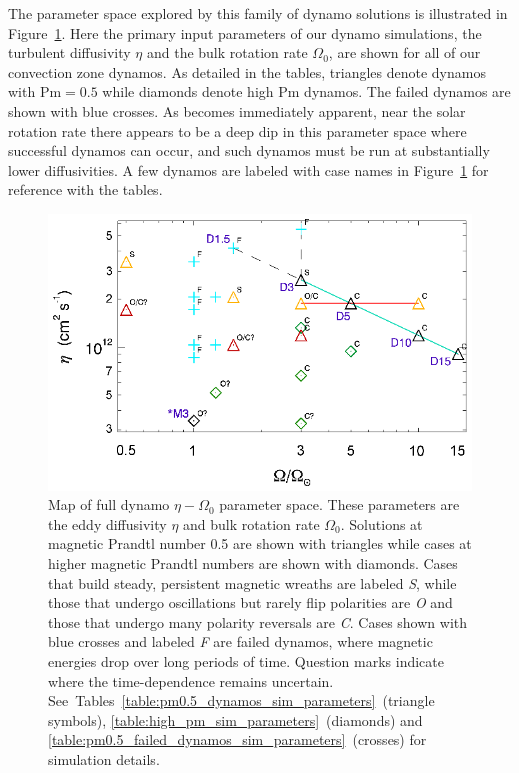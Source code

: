 The parameter space explored by this family of dynamo solutions is 
illustrated in Figure~\ref{fig:dynamo parameter space}.  Here the primary input
parameters of our dynamo simulations, the turbulent diffusivity $\eta$
and the bulk rotation rate $\Omega_0$, are shown for all of our
convection zone dynamos.  As detailed in the tables, triangles denote
dynamos with $\mathrm{Pm}=0.5$ while diamonds denote high
$\mathrm{Pm}$ dynamos.  The failed dynamos are shown with blue
crosses.  As becomes immediately apparent, near the solar rotation
rate there appears to be a deep dip in this parameter space where
successful dynamos can occur, and such dynamos must be run at
substantially lower diffusivities.  A few dynamos are
labeled with case names in Figure~\ref{fig:dynamo parameter space} for
reference with the tables.  

\begin{figure}[!t]
  \includegraphics[width=\linewidth]{figs/chapter_8/apj_dynamo_eta_paths.eps}
  \caption[Map of full dynamo $\eta-\Omega_0$ parameter space]
  {Map of full dynamo $\eta-\Omega_0$ parameter space.  
  These parameters are the eddy diffusivity $\eta$ and bulk
  rotation rate $\Omega_0$. 
  Solutions at magnetic Prandtl number 0.5 are shown with triangles
  while cases at higher magnetic Prandtl numbers are shown with
  diamonds.  Cases that build
  steady, persistent magnetic wreaths are labeled \emph{S}, while
  those that undergo oscillations but rarely flip polarities are
  \emph{O} and those that undergo many polarity reversals are 
  \emph{C}.  Cases shown with blue crosses and labeled \emph{F} are
  failed dynamos, where magnetic energies drop over long periods of
  time.  Question marks indicate where the time-dependence remains
  uncertain.  
  See~Tables~\ref{table:pm0.5_dynamos_sim_parameters}~(triangle
  symbols), \ref{table:high_pm_sim_parameters}~(diamonds) and
  \ref{table:pm0.5_failed_dynamos_sim_parameters}~(crosses) 
  for simulation details.
  \label{fig:dynamo parameter space}}
\end{figure}


